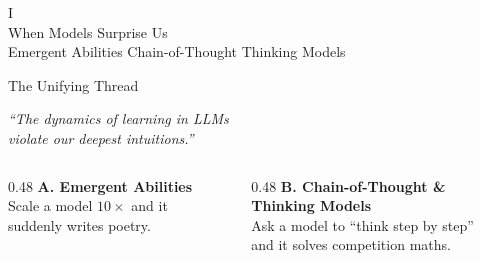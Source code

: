 \documentclass[aspectratio=169, 12pt]{beamer}
\begin{document}
\begin{frame}[standout]
  \Huge I\\[12pt]
  \Large When Models Surprise Us\\[6pt]
  \normalsize Emergent Abilities \;\textbullet\; Chain-of-Thought
    \;\textbullet\; Thinking Models
\end{frame}

\begin{frame}{The Unifying Thread}
  \begin{center}
    \large\itshape ``The dynamics of learning in LLMs\\
    violate our deepest intuitions.''
  \end{center}
  \vspace{1em}
  \begin{columns}[T]
    \begin{column}{0.48\textwidth}
      \centering
      \textbf{A. Emergent Abilities}\\[0.3em]
      {\small Scale a model $10\times$ and it\\suddenly writes poetry.}
    \end{column}
    \begin{column}{0.48\textwidth}
      \centering
      \textbf{B. Chain-of-Thought \&\\Thinking Models}\\[0.3em]
      {\small Ask a model to ``think step by step''\\and it solves competition maths.}
    \end{column}
  \end{columns}
\end{frame}
\end{document}
